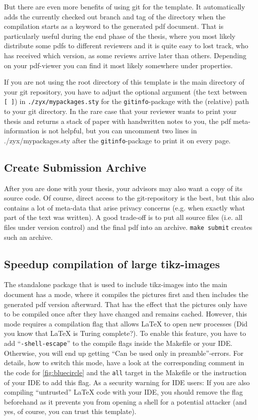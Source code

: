 \documentclass[\myrootdir/main.tex]{subfiles}
\begin{document}
But there are even more benefits of using git for the template.
It automatically adds the currently checked out branch and tag of the directory when the compilation starts as a keyword to the generated pdf document.
That is particularly useful during the end phase of the thesis, where you most likely distribute some pdfs to different reviewers and it is quite easy to lost track, who has received which version, as some reviews arrive later than others.
Depending on your pdf-viewer you can find it most likely somewhere under properties.

If you are not using the root directory of this template is the main directory of your git repository, you have to adjust the optional argument (the text between \texttt{[~]}) in \texttt{./zyx/mypackages.sty} for the \texttt{gitinfo}-package with the (relative) path to your git directory.
In the rare case that your reviewer wants to print your thesis and returns a stack of paper with handwritten notes to you, the pdf meta-information is not helpful, but you can uncomment two lines in {./zyx/mypackages.sty} after the \texttt{gitinfo}-package to print it on every page.

\subsection{Create Submission Archive}
After you are done with your thesis, your advisors may also want a copy of its source code.
Of course, direct access to the git-repository is the best, but this also contains a lot of meta-data that arise privacy concerns (e.g. when exactly what part of the text was written).
A good trade-off is to put all source files (i.e. all files under version control) and the final pdf into an archive.
\texttt{make submit} creates such an archive.

\subsection{Speedup compilation of large tikz-images}
The standalone package that is used to include tikz-images into the main document has a mode, where it compiles the pictures first and then includes the generated pdf version afterward.
That has the effect that the pictures only have to be compiled once after they have changed and remains cached.
However, this mode requires a compilation flag that allows LaTeX to open new processes (Did you know that LaTeX is Turing complete?).
To enable this feature, you have to add \enquote{\texttt{-shell-escape}} to the compile flags inside the Makefile or your IDE.
Otherwise, you will end up getting \enquote{Can be used only in preamble}-errors.
For details, how to switch this mode, have a look at the corresponding comment in the code for \cref{fig:bluecircle} and the \texttt{all} target in the Makefile or the instruction of your IDE to add this flag.
As a security warning for IDE users: If you are also compiling \enquote{untrusted} LaTeX code with your IDE, you should remove the flag beforehand as it prevents you from opening a shell for a potential attacker (and yes, of course, you can trust this template).
\end{document}
